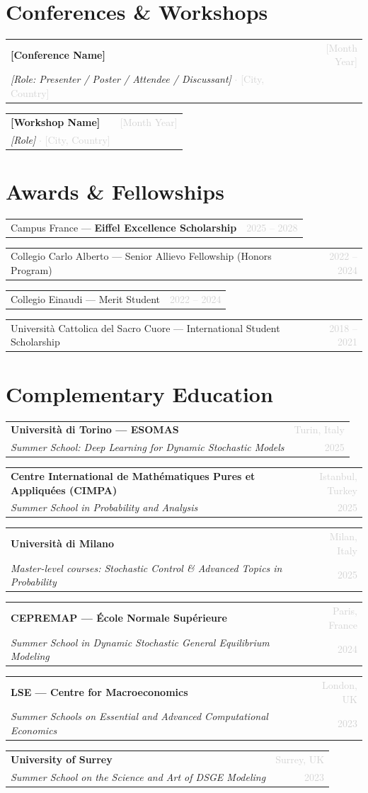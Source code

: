 \documentclass[11pt, a4paper]{article}
\makeatletter
\newcommand{\cventry}[4]{%
  \noindent
  \begin{tabular*}{\linewidth}{@{}l@{\extracolsep{\fill}}r@{}}
    \textbf{#1} & \textcolor{lightgray}{\small #2} \\
    \textit{#3} & \textcolor{lightgray}{\small #4} \\
  \end{tabular*}%
  \vspace{3pt}%
}
\newcommand{\cvaward}[2]{%
  \noindent
  \begin{tabular*}{\linewidth}{@{}l@{\extracolsep{\fill}}r@{}}
    #1 & \textcolor{lightgray}{\small #2} \\
  \end{tabular*}%
  \vspace{2pt}%
}
\newcommand{\cvconf}[4]{%
  \noindent
  \begin{tabular*}{\linewidth}{@{}l@{\extracolsep{\fill}}r@{}}
    \textbf{#1} & \textcolor{lightgray}{\small #4} \\
    \textit{#3} \textcolor{lightgray}{$\cdot$ #2} & \\
  \end{tabular*}%
  \vspace{3pt}%
}
\makeatother
\begin{document}
\section{Conferences \& Workshops}

%

\cvconf{%
  [Conference Name]%
}{%
  [City, Country]%
}{%
  [Role: Presenter / Poster / Attendee / Discussant]%
}{%
  [Month Year]%
}

\cvconf{%
  [Workshop Name]%
}{%
  [City, Country]%
}{%
  [Role]%
}{%
  [Month Year]%
}


\section{Awards \& Fellowships}

\cvaward{Campus France --- \textbf{Eiffel Excellence Scholarship}}{2025 -- 2028}
\cvaward{Collegio Carlo Alberto --- Senior Allievo Fellowship (Honors Program)}{2022 -- 2024}
\cvaward{Collegio Einaudi --- Merit Student}{2022 -- 2024}
\cvaward{Università Cattolica del Sacro Cuore --- International Student Scholarship}{2018 -- 2021}

\section{Complementary Education}

\cventry{Università di Torino --- ESOMAS}{Turin, Italy}%
  {Summer School: Deep Learning for Dynamic Stochastic Models}{2025}

\cventry{Centre International de Mathématiques Pures et Appliquées (CIMPA)}{Istanbul, Turkey}%
  {Summer School in Probability and Analysis}{2025}

\cventry{Università di Milano}{Milan, Italy}%
  {Master-level courses: Stochastic Control \& Advanced Topics in Probability}{2025}

\cventry{CEPREMAP --- École Normale Supérieure}{Paris, France}%
  {Summer School in Dynamic Stochastic General Equilibrium Modeling}{2024}

\cventry{LSE --- Centre for Macroeconomics}{London, UK}%
  {Summer Schools on Essential and Advanced Computational Economics}{2023}

\cventry{University of Surrey}{Surrey, UK}%
  {Summer School on the Science and Art of DSGE Modeling}{2023}
\end{document}
